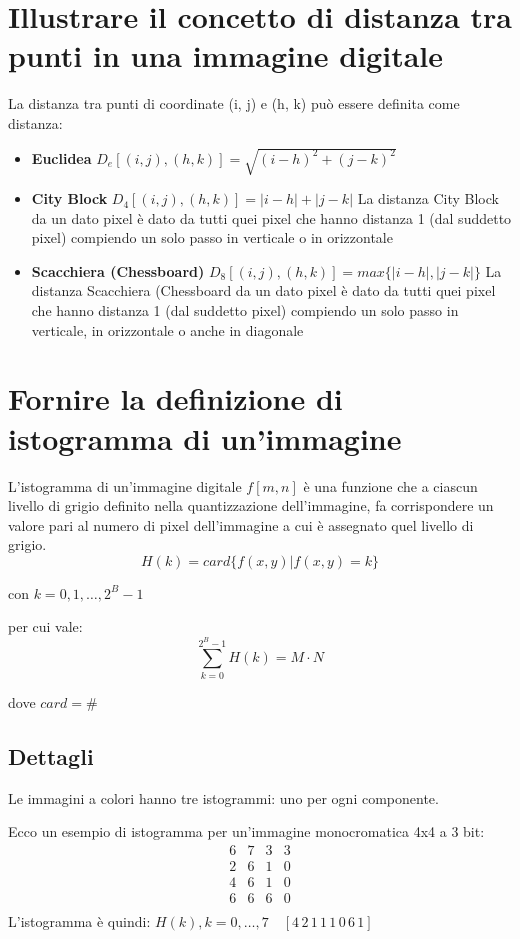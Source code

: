 \section{Illustrare il concetto di distanza tra punti in una immagine digitale}
La distanza tra punti di coordinate (i, j) e (h, k) può essere definita come distanza:
\begin{itemize}
	\item \textbf{Euclidea} $D_e[(i,j), (h,k)] = \sqrt{(i - h)^2 + (j - k)^2}$ 
	
	\item \textbf{City Block} $D_4[(i,j), (h,k)] = |i - h| + |j - k|$
	La distanza City Block da un dato pixel è dato da tutti quei pixel che hanno distanza 1 (dal suddetto pixel) compiendo un solo passo in verticale o in orizzontale
	
	\item \textbf{Scacchiera (Chessboard)} $D_8[(i,j), (h,k)] = max\{|i - h|, |j - k| \}$
	La distanza Scacchiera (Chessboard da un dato pixel è dato da tutti quei pixel che hanno distanza 1 (dal suddetto pixel) compiendo un solo passo in verticale, in orizzontale o anche in diagonale
\end{itemize}

\section{Fornire la definizione di istogramma di un'immagine}
L'istogramma di un'immagine digitale $f[m,n]$ è una funzione che a ciascun livello di grigio definito nella quantizzazione dell'immagine, fa corrispondere un valore pari al numero di pixel dell'immagine a cui è assegnato quel livello di grigio.
$$
H(k) = card \{ f(x,y) | f(x,y) = k \}
$$ 

con $k = 0, 1, \dots, 2^{B}-1$ 

per cui vale: 
$$ 
\displaystyle\sum_{k=0}^{{2^B}-1} H(k) = M \cdotp N
$$

dove $card = \#$

\subsection{Dettagli}
Le immagini a colori hanno tre istogrammi: uno per ogni componente. 

Ecco un esempio di istogramma per un'immagine monocromatica 4x4 a 3 bit:
$$
\begin{array}{c|c|c|c}
	6 & 7 & 3 & 3 \\ 
	\hline
	2 & 6 & 1 & 0 \\
	\hline
	4 & 6 & 1 & 0 \\
	\hline
	6 & 6 & 6 & 0 \\
\end{array}
$$
L'istogramma è quindi: $H(k), k = 0, \dots, 7 \quad [4 \, 2 \, 1 \, 1 \, 1 \, 0 \, 6 \, 1]$

